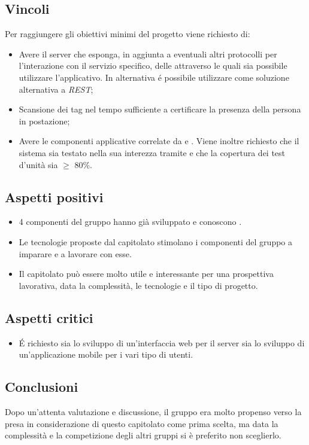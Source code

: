 \subsection{Vincoli}
Per raggiungere gli obiettivi minimi del progetto viene richiesto di:
\begin{itemize}
\item Avere il server che esponga, in aggiunta a eventuali altri protocolli per l’interazione con il servizio specifico, delle  \textit{} attraverso le quali sia possibile utilizzare l'applicativo. In alternativa \'e possibile utilizzare  come soluzione alternativa a \textit{REST};
\item Scansione dei tag nel tempo sufficiente a certificare la presenza della persona in postazione;
\item Avere le componenti applicative correlate da  e . Viene inoltre richiesto che il sistema sia testato nella sua interezza tramite  e che la copertura dei test d'unità sia $\geq$ 80\%.
\end{itemize}

\subsection{Aspetti positivi}
\begin{itemize} 
	\item 4 componenti del gruppo hanno già sviluppato e conoscono .
	\item Le tecnologie proposte dal capitolato stimolano i componenti del gruppo a imparare e a lavorare con esse.
	\item Il capitolato può essere molto utile e interessante per una prospettiva lavorativa, data la complessità, le tecnologie e il tipo di progetto.
\end{itemize}

\subsection{Aspetti critici}
\begin{itemize}
\item \'E richiesto sia lo sviluppo di un'interfaccia web per il server sia lo sviluppo di un'applicazione mobile per i vari tipo di utenti.
\end{itemize}

\subsection{Conclusioni}
Dopo un'attenta valutazione e discussione, il gruppo era molto propenso verso la presa in considerazione di questo capitolato come prima scelta, ma data la complessità e la competizione degli altri gruppi si è preferito non sceglierlo.
